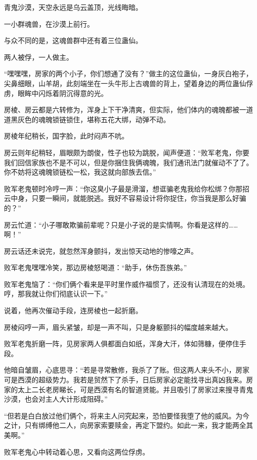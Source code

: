 
\begin{this_body}

青鬼沙漠，天空永远是乌云盖顶，光线晦暗。

一小群魂兽，在沙漠上前行。

与众不同的是，这魂兽群中还有着三位蛊仙。

两人被俘，一人做主。

“嘿嘿嘿，房家的两个小子，你们想通了没有？”做主的这位蛊仙，一身灰白袍子，尖鼻细眼，山羊胡，此刻端坐在一头牛形上古魂兽的背上，望着身边的两位蛊仙俘虏，眼眸中闪烁着阴沉得意的光。

房棱、房云都是六转修为，浑身上下干净清爽，但实际，他们体内的魂魄都被一道道黑灰色的魂魄锁链锁住，堪称五花大绑，动弹不动。

房棱年纪稍长，国字脸，此时闷声不吭。

房云则年纪稍轻，眉眼颇为朗俊，性子也较为跳脱，闻声便道：“败军老鬼，你要我们回信家族也不是不可以，但是你捆住我俩魂魄，我们通讯法门就催动不了了。你不妨将这魂魄锁链松一松，我这就向部族去信。”

败军老鬼顿时冷哼一声：“你这臭小子最是滑溜，想诓骗老鬼我给你松绑？你那招云中身，只要一瞬间，就能脱逃。我好不容易设计将你捉住，你当我是那么好骗的？”

房云忙道：“小子哪敢欺骗前辈呢？只是小子说的是实情啊。你看是这样的……啊！”

房云话还未说完，就忽然浑身颤抖，发出惊天动地的惨嚎之声。

败军老鬼嘿嘿冷笑，那边房棱怒喝道：“助手，休伤吾族弟。”

败军老鬼恼了：“你们俩个看来是平时里作威作福惯了，还没有认清现在的处境。哼，那我就让你们彻底认识一下。”

说着，他再次催动手段，连房棱也一起折磨。

房棱闷哼一声，眉头紧皱，却是一声不叫，只是身躯颤抖的幅度越来越大。

败军老鬼折磨一阵，见房家两人俱都面白如纸，浑身大汗，体如筛糠，便停住手段。

他暗自皱眉，心底思寻：“若是寻常散修，我杀了了账。但这两人来头不小，房家可是西漠的超级势力。我若是贸然下了杀手，日后房家必定能找寻出真凶我来。房家的太上二长老房睇长，可是西漠有名的智道贤能。并且吸引了房家过来搜寻青鬼沙漠，也会对主人大计形成阻碍。”

“但若是白白放过他们俩个，将来主人问究起来，恐怕要怪我堕了他的威风。为今之计，只有绑缚他二人，向房家索要赎金，再定下盟约。如此一来，我才能两全其美啊。”

败军老鬼心中转动着心思，又看向这两位俘虏。


\end{this_body}
